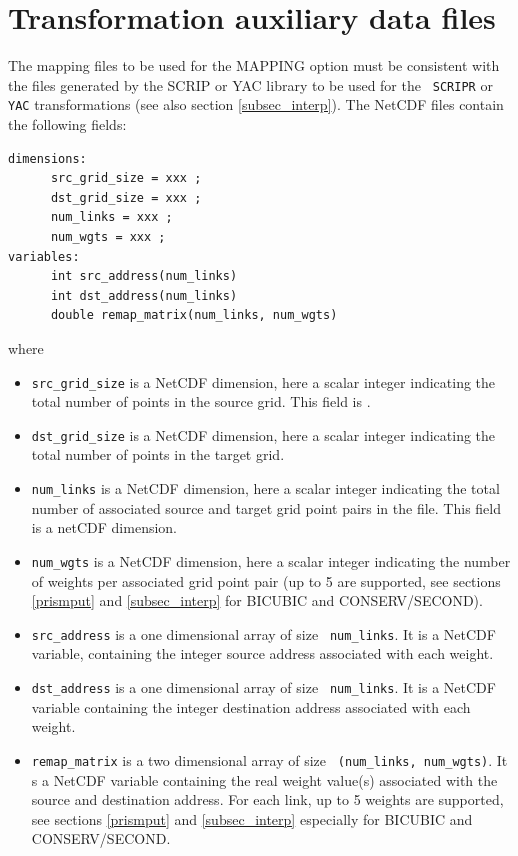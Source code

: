 
\section{Transformation auxiliary data files}
\label{subsec_mapdata}

The mapping files to be used for the MAPPING option must be consistent
with the files generated by the SCRIP or YAC library to be used for the {\tt
  SCRIPR} or {\tt YAC} transformations (see also section \ref{subsec_interp}). The
NetCDF files contain the following fields:
\begin{verbatim}
dimensions:
      src_grid_size = xxx ;
      dst_grid_size = xxx ;
      num_links = xxx ;
      num_wgts = xxx ;
variables:
      int src_address(num_links) 
      int dst_address(num_links) 
      double remap_matrix(num_links, num_wgts) 
\end{verbatim}
where
\begin{itemize}
\item {\tt src\_grid\_size} is a NetCDF dimension, here a scalar integer indicating the total number
  of points in the source grid.  
  This field is .
\item {\tt dst\_grid\_size} is a NetCDF dimension, here a scalar integer indicating the total number
  of points in the target grid.  
  \item {\tt num\_links} is a NetCDF dimension, here a scalar integer indicating the total number
  of associated source and target grid point pairs in the file.  This field is a netCDF dimension.
\item {\tt num\_wgts} is a NetCDF dimension, here a scalar integer indicating the number of
  weights per associated grid point pair (up to 5 are supported, see
  sections \ref{prismput} and \ref{subsec_interp} for BICUBIC and CONSERV/SECOND).
\item {\tt src\_address} is a one dimensional array of size {\tt
    num\_links}.  It is a NetCDF variable, containing the integer source address associated
  with each weight.
\item {\tt dst\_address} is a one dimensional array of size {\tt
    num\_links}.  It is a NetCDF variable containing the integer destination address
  associated with each weight.  
\item {\tt remap\_matrix} is a two dimensional array of size {\tt
    (num\_links, num\_wgts)}.  It s a NetCDF variable containing the real weight value(s)
  associated with the source and destination address.  For each link, 
  up to 5 weights are supported, see sections \ref{prismput} and \ref{subsec_interp} 
  especially for BICUBIC and CONSERV/SECOND. 
  \end{itemize}
